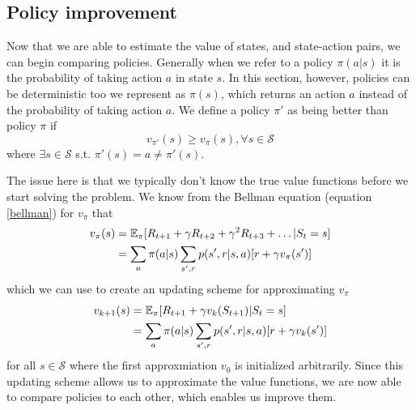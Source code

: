 \documentclass[11pt]{article}
\begin{document}
\maketitle


\subsection{Policy improvement}\label{sec:pol}


Now that we are able to estimate the value of states, and state-action pairs,
we can begin comparing policies.
Generally when we refer to a policy $\pi(a|s)$ it is the probability
of taking action $a$ in state $s$.
In this section, however, policies can be deterministic too we represent
as $\pi(s)$, which returns an action $a$ instead of the probability
of taking action $a$.
We define a policy $\pi'$ as being better than policy $\pi$ if
\begin{equation}
    v_{\pi'}(s) \geq v_{\pi}(s), \forall s \in \mathcal{S}
\end{equation}
where $\exists s \in \mathcal{S}$ s.t. $\pi'(s) = a \neq \pi'(s)$.

The issue here is that we typically don't know the true value functions before
we start solving the problem.
We know from the Bellman equation (equation \ref{bellman}) for $v_\pi$
that
\begin{equation}
    \begin{aligned}
        v_\pi(s) & = \mathbb{E}_\pi [R_{t+1} + \gamma R_{t+2} + \gamma^2 R_{t+3} + \dots | S_t = s] \\
                 & = \sum\limits_{a} \pi(a | s) \sum\limits_{s',r} p(s', r | s, a)[r + \gamma v_\pi(s')]
    \end{aligned}
\end{equation}
which we can use to create an updating scheme for approximating $v_\pi$
\begin{equation}
    \begin{aligned}
        v_{k+1}(s) & = \mathbb{E}_\pi[R_{t+1} + \gamma v_k(S_{t+1}) | S_t = s]\\
                   & = \sum\limits_{a} \pi(a | s) \sum\limits_{s',r} p(s', r | s, a)[r + \gamma v_k(s')]
    \end{aligned}
\end{equation}
for all $s \in \mathcal{S}$ where the first approxmiation $v_0$
is initialized arbitrarily\cite{RLbook}.
Since this updating scheme allows us to approximate the value functions,
we are now able to compare policies to each other, which enables us
improve them. 
\end{document}
